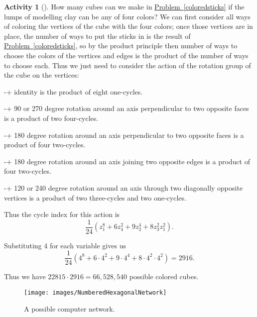 \documentclass[10pt,]{book}
\theoremstyle{plain}
\theoremstyle{definition}
\newtheorem{activity}[project]{Activity}
\numberwithin{equation}{chapter}
\begin{document}
\begin{activity}[]\label{activity-331}
How many cubes can we make in \hyperref[coloredsticks]{Problem~\ref{coloredsticks}} if the lumps of modelling clay can be any of four colors?%
We can first consider all ways of coloring the vertices of the cube with the four colors; once those vertices are in place, the number of ways to put the sticks in is the result of \hyperref[coloredsticks]{Problem~\ref{coloredsticks}}, so by the product principle then number of ways to choose the colors of the vertices and edges is the product of the number of ways to choose each. Thus we just need to consider the action of the rotation group of the cube on the vertices:%
\par
-+ identity is the product of eight one-cycles.%
\par
-+ 90 or 270 degree rotation around an axis perpendicular to two opposite faces is a product of two four-cycles.%
\par
-+ 180 degree rotation around an axis perpendicular to two opposite faces is a product of four two-cycles.%
\par
-+ 180 degree rotation around an axis joining two opposite edges is a product of four two-cycles.%
\par
-+ 120 or 240 degree rotation around an axis through two diagonally opposite vertices is a product of two three-cycles and two one-cycles.%
\par
Thus the cycle index for this action is%
\begin{equation*}
\frac{1}{24}\left(z_1^8+6z_4^2 + 9z_2^4 + 8z_3^2z_1^2\right).
\end{equation*}
%
\par
Substituting 4 for each variable gives us%
\begin{equation*}
\frac{1}{24}\left(4^8+6\cdot4^2 +9\cdot 4^4 + 8\cdot4^2\cdot4^2\right)=2916.
\end{equation*}
%
\par
Thus we have \(22815\cdot2916=66,528,540\) possible colored cubes.%
\begin{figure}
\centering
\texttt{[image: images/NumberedHexagonalNetwork]}
\caption{A possible computer network.\label{HexNet}}
\end{figure}
\end{activity}
\end{document}
